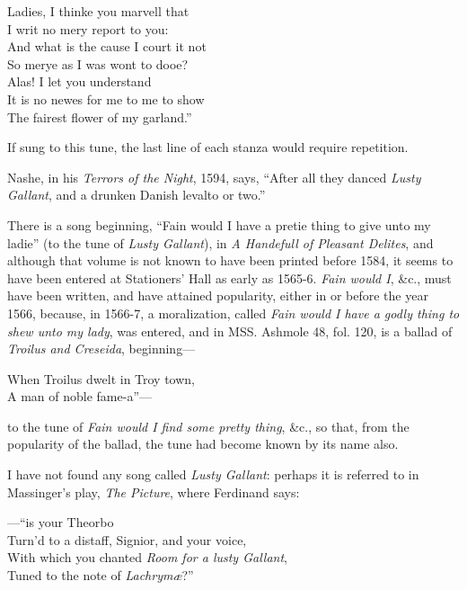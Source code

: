\begin{scverse}
Ladies, I thinke you marvell that\\
I writ no mery report to you:\\
And what is the cause I court it not\\
So merye as I was wont to dooe?\\
Alas! I let you understand\\
It is no newes for me to me to show\\
The fairest flower of my garland.”
\end{scverse}
If sung to this tune, the last line of each stanza would require repetition.

Nashe, in his \textit{Terrors of the Night}, 1594, says, “After all they danced \textit{Lusty
Gallant}, and a drunken Danish levalto or two.”

There is a song beginning, “Fain would I have a pretie thing to give unto my
ladie” (to the tune of \textit{Lusty Gallant}), in \textit{A Handefull of Pleasant Delites}, and
although that volume is not known to have been printed before 1584, it seems to
have been entered at Stationers’ Hall as early as 1565-6. \textit{Fain would I}, \&c.,
must have been written, and have attained popularity, either in or before the
year 1566, because, in 1566-7, a moralization, called \textit{Fain would I have a godly
thing to shew unto my lady}, was entered, and in MSS. Ashmole 48, fol. 120, is a
ballad of \textit{Troilus and Creseida}, beginning—
\begin{scverse}
When Troilus dwelt in Troy town,\\
A man of noble fame-a”—
\end{scverse}
to the tune of \textit{Fain would I find some pretty thing}, \&c., so that, from the popularity
of the ballad, the tune had become known by its name also.

I have not found any song called \textit{Lusty Gallant}: perhaps it is referred to in
Massinger’s play, \textit{The Picture}, where Ferdinand says:

\pagebreak
\begin{scverse}
\vin\vin\vin\vin\vin\vin ---“is your Theorbo\\
Turn’d to a distaff, Signior, and your voice,\\
With which you chanted \textit{Room for a lusty Gallant},\\
Tuned to the note of \textit{Lachrymæ}?”
\end{scverse}


